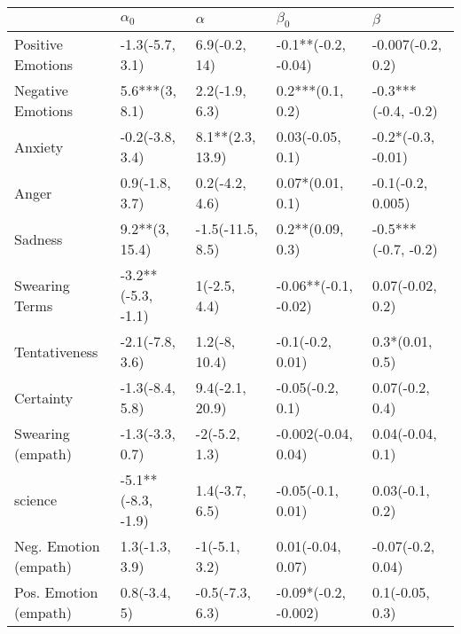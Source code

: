 \begin{tabular}{lllll}
\toprule
{} &          $\alpha_0$ &          $\alpha$ &             $\beta_0$ &              $\beta$ \\
\midrule
Positive Emotions     &     -1.3(-5.7, 3.1) &     6.9(-0.2, 14) &   -0.1**(-0.2, -0.04) &    -0.007(-0.2, 0.2) \\
Negative Emotions     &      5.6***(3, 8.1) &    2.2(-1.9, 6.3) &      0.2***(0.1, 0.2) &  -0.3***(-0.4, -0.2) \\
Anxiety               &     -0.2(-3.8, 3.4) &  8.1**(2.3, 13.9) &      0.03(-0.05, 0.1) &   -0.2*(-0.3, -0.01) \\
Anger                 &      0.9(-1.8, 3.7) &    0.2(-4.2, 4.6) &      0.07*(0.01, 0.1) &    -0.1(-0.2, 0.005) \\
Sadness               &      9.2**(3, 15.4) &  -1.5(-11.5, 8.5) &      0.2**(0.09, 0.3) &  -0.5***(-0.7, -0.2) \\
Swearing Terms        &  -3.2**(-5.3, -1.1) &      1(-2.5, 4.4) &  -0.06**(-0.1, -0.02) &     0.07(-0.02, 0.2) \\
Tentativeness         &     -2.1(-7.8, 3.6) &     1.2(-8, 10.4) &      -0.1(-0.2, 0.01) &      0.3*(0.01, 0.5) \\
Certainty             &     -1.3(-8.4, 5.8) &   9.4(-2.1, 20.9) &      -0.05(-0.2, 0.1) &      0.07(-0.2, 0.4) \\
Swearing (empath)     &     -1.3(-3.3, 0.7) &     -2(-5.2, 1.3) &   -0.002(-0.04, 0.04) &     0.04(-0.04, 0.1) \\
science               &  -5.1**(-8.3, -1.9) &    1.4(-3.7, 6.5) &     -0.05(-0.1, 0.01) &      0.03(-0.1, 0.2) \\
Neg. Emotion (empath) &      1.3(-1.3, 3.9) &     -1(-5.1, 3.2) &     0.01(-0.04, 0.07) &    -0.07(-0.2, 0.04) \\
Pos. Emotion (empath) &        0.8(-3.4, 5) &   -0.5(-7.3, 6.3) &  -0.09*(-0.2, -0.002) &      0.1(-0.05, 0.3) \\
\bottomrule
\end{tabular}
